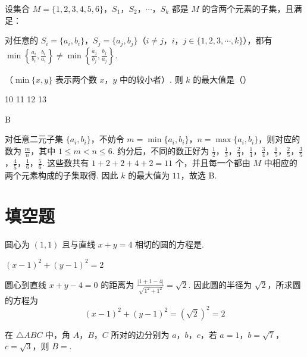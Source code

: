 \begin{problem}
设集合 \(M = \{1, 2, 3, 4, 5, 6\}\)，\(S_1\)，\(S_2\)，\(\cdots\)，\(S_k\) 都是 \(M\) 的含两个元素的子集，且满足：

对任意的 \(S_i = \{a_i, b_i\}\)，\(S_j = \{a_j, b_j\}\)（\(i \neq j\)，\(i\)，\(j \in \{1, 2, 3, \cdots, k\}\)），都有
\(\min \left\{\frac{a_i}{b_i}, \frac{b_i}{a_i}\right\} \neq \min \left\{\frac{a_j}{b_j}, \frac{b_j}{a_j}\right\}\).

（\(\min \{x, y\}\) 表示两个数 \(x\)，\(y\) 中的较小者）. 则 \(k\) 的最大值是（\quad）

\choices
    {10}
    {11}
    {12}
    {13}
\end{problem}

\begin{answer}
B
\end{answer}

\begin{solution}
对任意二元子集 \(\{a_i,b_i\}\)，不妨令 \(m=\min\{a_i,b_i\}\)，\(n=\max\{a_i,b_i\}\)，则对应的数为 \(\frac{m}{n}\)，其中 \(1\leqslant m<n\leqslant6\). 约分后，不同的数正好为 \(\frac12\)，\(\frac13\)，\(\frac23\)，\(\frac14\)，\(\frac34\)，\(\frac15\)，\(\frac25\)，\(\frac35\)，\(\frac45\)，\(\frac16\)，\(\frac56\).
这些数共有 \(1+2+2+4+2=11\) 个，并且每一个都由 \(M\) 中相应的两个元素构成的子集取得. 因此 \(k\) 的最大值为 \(11\)，故选 B.
\end{solution}

\section{填空题}

\begin{problem}
圆心为 \((1,1)\) 且与直线 \(x + y = 4\) 相切的圆的方程是\fillinblank{}.
\end{problem}

\begin{answer}
\((x-1)^2+(y-1)^2=2\)
\end{answer}

\begin{solution}
圆心到直线 \(x+y-4=0\) 的距离为 \(\frac{|1+1-4|}{\sqrt{1^2+1^2}}=\sqrt{2}\).
因此圆的半径为 \(\sqrt{2}\)，所求圆的方程为
\[
\left(x-1\right)^2+\left(y-1\right)^2=\left(\sqrt{2}\right)^2=2
\]
\end{solution}

\begin{problem}
在 \(\triangle ABC\) 中，角 \(A\)，\(B\)，\(C\) 所对的边分别为 \(a\)，\(b\)，\(c\)，若 \(a = 1\)，\(b = \sqrt{7}\)，\(c = \sqrt{3}\)，则 \(B = \)\fillinblank{}.
\end{problem}

